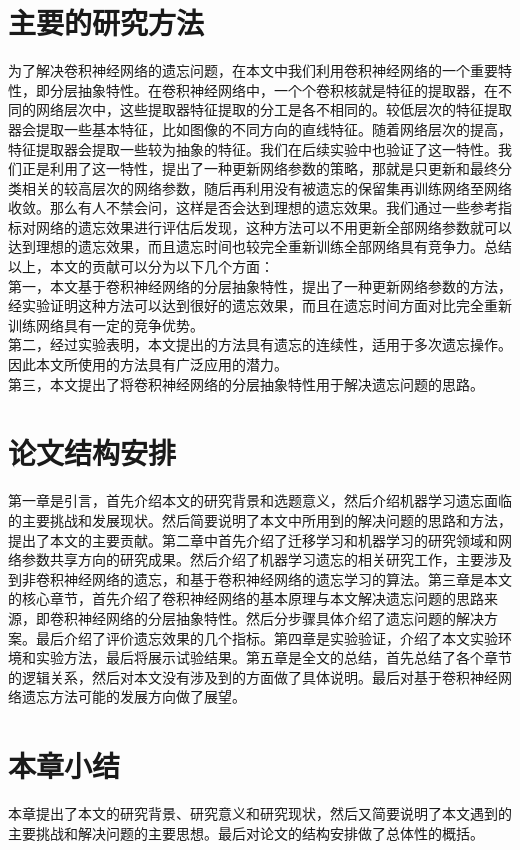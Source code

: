 \section{主要的研究方法}
为了解决卷积神经网络的遗忘问题，在本文中我们利用卷积神经网络的一个重要特性，即分层抽象特性。在卷积神经网络中，一个个卷积核就是特征的提取器，在不同的网络层次中，这些提取器特征提取的分工是各不相同的。较低层次的特征提取器会提取一些基本特征，比如图像的不同方向的直线特征。随着网络层次的提高，特征提取器会提取一些较为抽象的特征。我们在后续实验中也验证了这一特性。我们正是利用了这一特性，提出了一种更新网络参数的策略，那就是只更新和最终分类相关的较高层次的网络参数，随后再利用没有被遗忘的保留集再训练网络至网络收敛。那么有人不禁会问，这样是否会达到理想的遗忘效果。我们通过一些参考指标对网络的遗忘效果进行评估后发现，这种方法可以不用更新全部网络参数就可以达到理想的遗忘效果，而且遗忘时间也较完全重新训练全部网络具有竞争力。总结以上，本文的贡献可以分为以下几个方面：
\\第一，本文基于卷积神经网络的分层抽象特性，提出了一种更新网络参数的方法，经实验证明这种方法可以达到很好的遗忘效果，而且在遗忘时间方面对比完全重新训练网络具有一定的竞争优势。
\\第二，经过实验表明，本文提出的方法具有遗忘的连续性，适用于多次遗忘操作。因此本文所使用的方法具有广泛应用的潜力。
\\第三，本文提出了将卷积神经网络的分层抽象特性用于解决遗忘问题的思路。
\section{论文结构安排}
第一章是引言，首先介绍本文的研究背景和选题意义，然后介绍机器学习遗忘面临的主要挑战和发展现状。然后简要说明了本文中所用到的解决问题的思路和方法，提出了本文的主要贡献。第二章中首先介绍了迁移学习和机器学习的研究领域和网络参数共享方向的研究成果。然后介绍了机器学习遗忘的相关研究工作，主要涉及到非卷积神经网络的遗忘，和基于卷积神经网络的遗忘学习的算法。第三章是本文的核心章节，首先介绍了卷积神经网络的基本原理与本文解决遗忘问题的思路来源，即卷积神经网络的分层抽象特性。然后分步骤具体介绍了遗忘问题的解决方案。最后介绍了评价遗忘效果的几个指标。第四章是实验验证，介绍了本文实验环境和实验方法，最后将展示试验结果。第五章是全文的总结，首先总结了各个章节的逻辑关系，然后对本文没有涉及到的方面做了具体说明。最后对基于卷积神经网络遗忘方法可能的发展方向做了展望。
\section{本章小结}
本章提出了本文的研究背景、研究意义和研究现状，然后又简要说明了本文遇到的主要挑战和解决问题的主要思想。最后对论文的结构安排做了总体性的概括。
